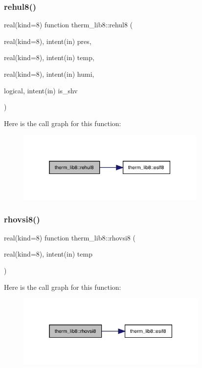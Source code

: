 \subsubsection{\texorpdfstring{rehul8()}{rehul8()}}
{\footnotesize\ttfamily real(kind=8) function therm\+\_\+lib8\+::rehul8 (\begin{DoxyParamCaption}\item[{real(kind=8), intent(in)}]{pres,  }\item[{real(kind=8), intent(in)}]{temp,  }\item[{real(kind=8), intent(in)}]{humi,  }\item[{logical, intent(in)}]{is\+\_\+shv }\end{DoxyParamCaption})}

Here is the call graph for this function\+:
\nopagebreak
\begin{figure}[H]
\begin{center}
\leavevmode
\includegraphics[width=265pt]{namespacetherm__lib8_a00df68c843939c4d08f0e8ef99ad4fba_cgraph}
\end{center}
\end{figure}
\mbox{\label{namespacetherm__lib8_ab68e2d396a76f6b21291816fcfcc73a2}} 
\subsubsection{\texorpdfstring{rhovsi8()}{rhovsi8()}}
{\footnotesize\ttfamily real(kind=8) function therm\+\_\+lib8\+::rhovsi8 (\begin{DoxyParamCaption}\item[{real(kind=8), intent(in)}]{temp }\end{DoxyParamCaption})}

Here is the call graph for this function\+:
\nopagebreak
\begin{figure}[H]
\begin{center}
\leavevmode
\includegraphics[width=268pt]{namespacetherm__lib8_ab68e2d396a76f6b21291816fcfcc73a2_cgraph}
\end{center}
\end{figure}
\mbox{\label{namespacetherm__lib8_ac356df009ed9ba07965dde7292121e0c}} 
